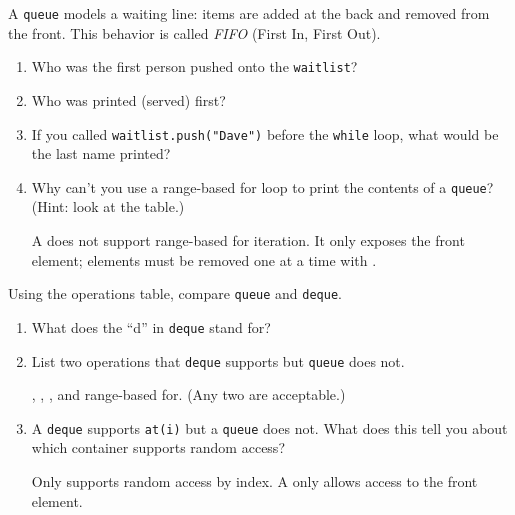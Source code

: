   \Q A {\tt queue} models a waiting line: items are added at the back
    and removed from the front.  This behavior is called
    {\it FIFO} (First In, First Out).
    \begin{enumerate}
      \itemsep 10pt
      \item Who was the first person pushed onto the {\tt waitlist}?
        \hfill{}

      \item Who was printed (served) first?
        \hfill{}

      \item If you called {\tt waitlist.push("Dave")} before the
        {\tt while} loop, what would be the last name printed?
        \hfill{}

      \item Why can't you use a range-based for loop to print the
        contents of a {\tt queue}?  (Hint: look at the table.)
        \begin{answer}[0.5in]
          A  does not support range-based for iteration.
          It only exposes the front element; elements must be removed
          one at a time with .
        \end{answer}
    \end{enumerate}

  \vskip -20pt

  \Q Using the operations table, compare {\tt queue} and {\tt deque}.\key\\[-2mm]
    \begin{enumerate}
      \itemsep 10pt
      \item What does the ``d'' in {\tt deque} stand for?
        \hfill{}

      \item List two operations that {\tt deque} supports but {\tt queue}
        does not.
        \begin{answer}[0.5in]
          , , , and
          range-based for.  (Any two are acceptable.)
        \end{answer}

      \item A {\tt deque} supports {\tt at(i)} but a {\tt queue} does not.
        What does this tell you about which container supports random access?
        \begin{answer}[0.5in]
          Only  supports random access by index.
          A  only allows access to the front element.
        \end{answer}
    \end{enumerate}

